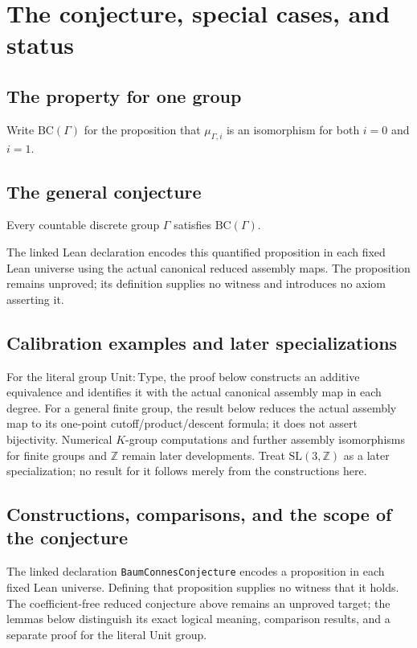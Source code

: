 \chapter{The conjecture, special cases, and status}
\label{ch:conjecture-and-examples}

\section{The property for one group}
\begin{definition}\label{def:baum-connes-property}
\leanok
Write $\mathrm{BC}(\Gamma)$ for the proposition that $\mu_{\Gamma,i}$
is an isomorphism for both $i=0$ and $i=1$.
\end{definition}

\section{The general conjecture}
\begin{conjecture}\label{conj:baum-connes}
\notready
Every countable discrete group $\Gamma$ satisfies $\mathrm{BC}(\Gamma)$.
\end{conjecture}

The linked Lean declaration encodes this quantified proposition in each
fixed Lean universe using the actual canonical reduced assembly maps.
The proposition remains unproved; its definition supplies no witness and
introduces no axiom asserting it.

\section{Calibration examples and later specializations}
For the literal group $\mathrm{Unit}:\mathrm{Type}$, the proof below
constructs an additive equivalence and identifies it with the actual canonical
assembly map in each degree. For a general finite group, the result below
reduces the actual assembly map to its one-point cutoff/product/descent
formula; it does not assert bijectivity. Numerical $K$-group computations
and further assembly isomorphisms for finite groups and $\mathbb Z$ remain
later developments. Treat $\mathrm{SL}(3,\mathbb Z)$ as a later specialization;
no result for it follows merely from the constructions here.


\section{Constructions, comparisons, and the scope of the conjecture}
The linked declaration \texttt{BaumConnesConjecture} encodes a proposition
in each fixed Lean universe. Defining that proposition supplies no witness
that it holds. The coefficient-free reduced conjecture above remains an
unproved target; the lemmas below distinguish its exact logical meaning,
comparison results, and a separate proof for the literal Unit group.

